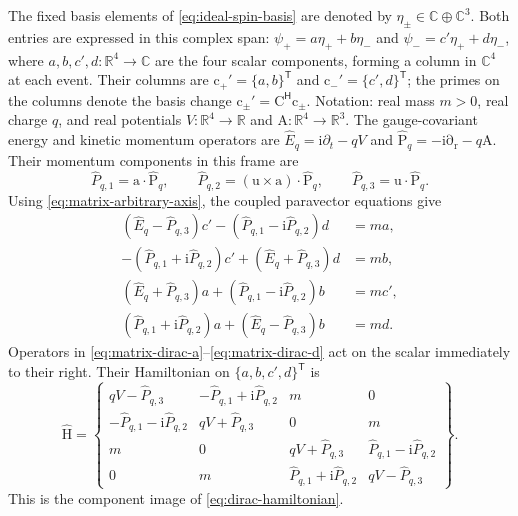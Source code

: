 \documentclass[11pt]{article}
\newcommand{\pvGreek}[1]{{#1}}
\newcommand{\vstyle}[1]{{\bm{\mathrm{#1}}}}
\newcommand{\pveta}{\pvGreek{\eta}}
\newcommand{\pvpsi}{\pvGreek{\psi}}
\numberwithin{equation}{section}
\newcommand{\R}{\mathbb{R}}
\newcommand{\C}{\mathbb{C}}
\newcommand{\ii}{\mathrm{i}}
\newcommand{\dotprod}{\cdot}
\newcommand{\bA}{\vstyle{A}}
\newcommand{\br}{\vstyle{r}}
\newcommand{\bu}{\vstyle{u}}
\newcommand{\ba}{\vstyle{a}}
\newcommand{\bp}{\vstyle{P}}
\newcommand{\hEq}{\hat E_q}
\newcommand{\hbpq}{\hat{\bp}_q}
\newcommand{\hH}{\hat{\vstyle{H}}}
\newcommand{\pdr}{\vstyle{\partial}_{\br}}
\begin{document}
The fixed basis elements of \eqref{eq:ideal-spin-basis} are denoted by
$\pveta_\pm\in\C\oplus\C^3$. Both entries are expressed in this complex span:
$\pvpsi_+=a\pveta_++b\pveta_-$ and $\pvpsi_-=c'\pveta_++d\pveta_-$,
where $a,b,c',d:\R^4\to\C$ are the four scalar components,
forming a column in $\C^4$ at each event.
Their columns are $\vstyle{c}_+'=\{a,b\}^{\mathsf T}$ and
$\vstyle{c}_-'=\{c',d\}^{\mathsf T}$; the primes on the columns denote the basis change
$\vstyle{c}_\pm'=\vstyle{C}^{\mathsf H}\vstyle{c}_\pm$.
Notation: real mass $m>0$, real charge $q$, and
real potentials $V:\R^4\to\R$ and $\bA:\R^4\to\R^3$.
The gauge-covariant energy and kinetic momentum operators are $\hEq=\ii\partial_t-qV$ and
$\hbpq=-\ii\pdr-q\bA$.  Their momentum components in this frame are
\[
 \hat P_{q,1}=\ba\dotprod\hbpq,\qquad \hat P_{q,2}=(\bu\times\ba)\dotprod\hbpq,
 \qquad \hat P_{q,3}=\bu\dotprod\hbpq.
\]
Using \eqref{eq:matrix-arbitrary-axis}, the coupled paravector equations give
\begin{align}
 (\hEq-\hat P_{q,3})c'-(\hat P_{q,1}-\ii \hat P_{q,2})d&=ma,
 \label{eq:matrix-dirac-a}\\
 -(\hat P_{q,1}+\ii \hat P_{q,2})c'+(\hEq+\hat P_{q,3})d&=mb,
 \label{eq:matrix-dirac-b}\\
 (\hEq+\hat P_{q,3})a+(\hat P_{q,1}-\ii \hat P_{q,2})b&=mc',
 \label{eq:matrix-dirac-c}\\
 (\hat P_{q,1}+\ii \hat P_{q,2})a+(\hEq-\hat P_{q,3})b&=md.
 \label{eq:matrix-dirac-d}
\end{align}
Operators in \eqref{eq:matrix-dirac-a}--\eqref{eq:matrix-dirac-d}
act on the scalar immediately to their right.  Their Hamiltonian
on $\{a,b,c',d\}^{\mathsf T}$ is
\begin{equation}
 \hH=\begin{Bmatrix}
 qV-\hat P_{q,3}&-\hat P_{q,1}+\ii \hat P_{q,2}&m&0\\
 -\hat P_{q,1}-\ii \hat P_{q,2}&qV+\hat P_{q,3}&0&m\\
 m&0&qV+\hat P_{q,3}&\hat P_{q,1}-\ii \hat P_{q,2}\\
 0&m&\hat P_{q,1}+\ii \hat P_{q,2}&qV-\hat P_{q,3}
 \end{Bmatrix}.
 \label{eq:matrix-dirac-hamiltonian}
\end{equation}
This is the component image of \eqref{eq:dirac-hamiltonian}.
\end{document}
